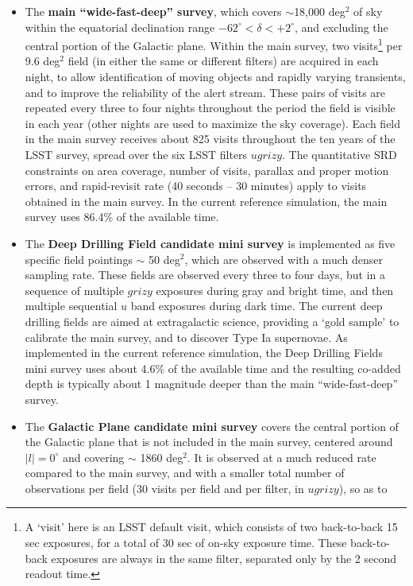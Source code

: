 \documentclass[DM,lsstdraft,toc,usenatbib]{lsstdoc}
\begin{document}
\begin{itemize}
\item The {\bf main ``wide-fast-deep'' survey}, which covers $\sim$18,000 deg$^2$ of sky within
the equatorial declination
range $-62^\circ < \delta < +2^\circ$, and excluding the central portion of the Galactic 
plane. Within the main survey, two visits\footnote{A `visit' here is an LSST default visit, which 
consists of two back-to-back 15 sec exposures, for a total of 30 sec of on-sky exposure time. These back-to-back exposures are always
in the same filter, separated only by the 2 second readout time.} 
per 9.6 deg$^2$ field (in either the same or different filters) are acquired in each night, to allow identification of moving objects and rapidly varying transients, and to improve
the reliability of the alert stream. These pairs of visits are repeated every three to four nights throughout the period the field is visible in each year (other nights are used to maximize the sky coverage). Each
field in the main survey receives about 825 visits throughout the ten years of the LSST survey, spread over the six LSST filters 
$ugrizy$. The quantitative SRD constraints on area coverage, number of visits, parallax and proper motion errors, and 
rapid-revisit rate (40 seconds -- 30 minutes) apply to visits obtained in the main survey. 
In the current reference simulation, the main survey uses 86.4\% of the available time.
\item The {\bf Deep Drilling Field candidate mini survey} is implemented as five specific field pointings $\sim$ 50 deg$^2$, 
which are observed with a much denser sampling rate. These fields
are observed every three to four days, but in a sequence of multiple $grizy$ exposures during gray and bright time, and then
multiple sequential $u$ band exposures during dark time. The current deep drilling fields are aimed at extragalactic
science, providing a `gold sample' to calibrate the main survey, and to discover Type Ia supernovae. 
As implemented in the current reference simulation, the Deep Drilling Fields mini survey uses about 4.6\% of the available time
and the resulting co-added depth is typically about 1 magnitude deeper than the main ``wide-fast-deep'' survey. 
\item The {\bf Galactic Plane candidate mini survey} covers the central portion of the Galactic plane that is not included in the main survey, 
centered around $|l| = 0^\circ$ and covering $\sim$ 1860 deg$^2$.  It is observed at a much reduced rate compared to the main survey, 
and with a smaller total number of observations per field (30 visits per field and per filter, in $ugrizy$), so as to

\end{itemize}
\end{document}
